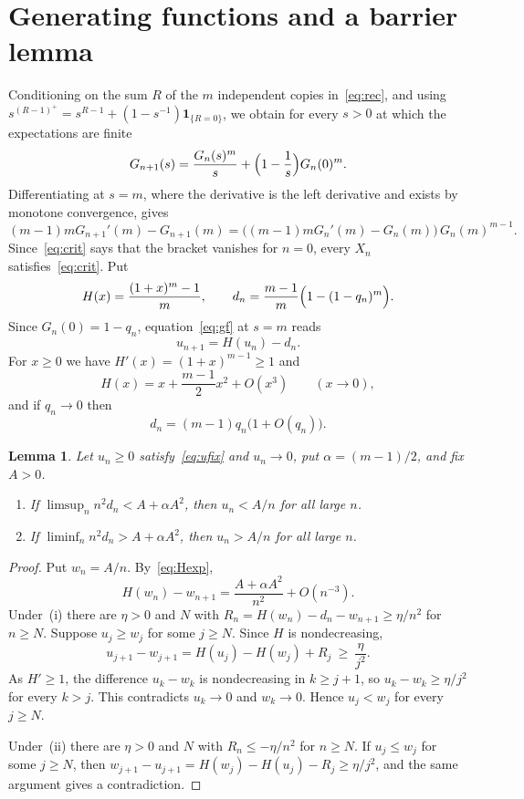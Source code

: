 \documentclass[11pt]{amsart}
\newtheorem{lemma}[theorem]{Lemma}
\theoremstyle{remark}
\numberwithin{equation}{section}
\begin{document}
\section{Generating functions and a barrier lemma}\label{sec:gf}
Conditioning on the sum $R$ of the $m$ independent copies in~\eqref{eq:rec}, and using $s^{(R-1)^+}=s^{R-1}+(1-s^{-1})\mathbf 1_{\{R=0\}}$, we obtain for every $s>0$ at which the expectations are finite
\begin{equation}\label{eq:gf}
G_{n+1}(s)=\frac{G_n(s)^m}{s}+\Bigl(1-\frac1s\Bigr)G_n(0)^m .
\end{equation}
Differentiating at $s=m$, where the derivative is the left derivative and exists by monotone convergence, gives
\begin{equation}\label{eq:critprop}
(m-1)mG_{n+1}'(m)-G_{n+1}(m)=\bigl((m-1)mG_n'(m)-G_n(m)\bigr)\,G_n(m)^{m-1} .
\end{equation}
Since~\eqref{eq:crit} says that the bracket vanishes for $n=0$, every $X_n$ satisfies~\eqref{eq:crit}. Put
\[
H(x)=\frac{(1+x)^m-1}{m},\qquad d_n=\frac{m-1}{m}\Bigl(1-(1-q_n)^m\Bigr).
\]
Since $G_n(0)=1-q_n$, equation~\eqref{eq:gf} at $s=m$ reads
\begin{equation}\label{eq:ufix}
u_{n+1}=H(u_n)-d_n .
\end{equation}
For $x\ge0$ we have $H'(x)=(1+x)^{m-1}\ge1$ and
\begin{equation}\label{eq:Hexp}
H(x)=x+\frac{m-1}{2}x^2+O(x^3)\qquad(x\to0),
\end{equation}
and if $q_n\to0$ then
\begin{equation}\label{eq:dn}
d_n=(m-1)q_n\bigl(1+O(q_n)\bigr).
\end{equation}

\begin{lemma}\label{lem:barrier}
Let $u_n\ge0$ satisfy~\eqref{eq:ufix} and $u_n\to0$, put $\alpha=(m-1)/2$, and fix $A>0$.
\begin{enumerate}[label=\textup{(\roman*)}]
\item If $\limsup_n n^2d_n<A+\alpha A^2$, then $u_n<A/n$ for all large $n$.
\item If $\liminf_n n^2d_n>A+\alpha A^2$, then $u_n>A/n$ for all large $n$.
\end{enumerate}
\end{lemma}

\begin{proof}
Put $w_n=A/n$. By~\eqref{eq:Hexp},
\[
H(w_n)-w_{n+1}=\frac{A+\alpha A^2}{n^2}+O(n^{-3}).
\]
Under~(i) there are $\eta>0$ and $N$ with $R_n=H(w_n)-d_n-w_{n+1}\ge\eta/n^2$ for $n\ge N$. Suppose $u_j\ge w_j$ for some $j\ge N$. Since $H$ is nondecreasing,
\[
u_{j+1}-w_{j+1}=H(u_j)-H(w_j)+R_j\ \ge\ \frac{\eta}{j^2}.
\]
As $H'\ge1$, the difference $u_k-w_k$ is nondecreasing in $k\ge j+1$, so $u_k-w_k\ge\eta/j^2$ for every $k>j$. This contradicts $u_k\to0$ and $w_k\to0$. Hence $u_j<w_j$ for every $j\ge N$.

Under~(ii) there are $\eta>0$ and $N$ with $R_n\le-\eta/n^2$ for $n\ge N$. If $u_j\le w_j$ for some $j\ge N$, then $w_{j+1}-u_{j+1}=H(w_j)-H(u_j)-R_j\ge\eta/j^2$, and the same argument gives a contradiction.
\end{proof}
\end{document}
